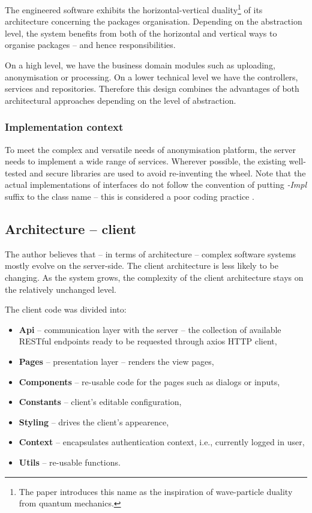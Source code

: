 \documentclass[a4paper,twoside,12pt]{book}
\begin{document}
The engineered software exhibits the horizontal-vertical duality\footnote{The paper introduces this name as the inspiration of wave-particle duality from quantum mechanics.} of its architecture concerning the packages organisation. Depending on the abstraction level, the system benefits from both of the horizontal and vertical ways to organise packages -- and hence responsibilities.

On a high level, we have the business domain modules such as uploading, anonymisation or processing. On a lower technical level we have the controllers, services and repositories. Therefore this design combines the advantages of both architectural approaches depending on the level of abstraction.


\subsubsection{Implementation context}

To meet the complex and versatile needs of anonymisation platform, the server needs to implement a wide range of services. Wherever possible, the existing well-tested and secure libraries are used to avoid re-inventing the wheel. Note that the actual implementations of interfaces do not follow the convention of putting \textit{-Impl} suffix to the class name -- this is considered a poor coding practice \cite{bib:clean_architecture}.

\subsection{Architecture -- client}
 
The author believes that -- in terms of architecture -- complex software systems mostly evolve on the server-side. The client architecture is less likely to be changing. As the system grows, the complexity of the client architecture stays on the relatively unchanged level.

The client code was divided into:
\begin{itemize}
\item \textbf{Api} -- communication layer with the server -- the collection of available RESTful endpoints ready to be requested through axios HTTP client,
\item \textbf{Pages} -- presentation layer -- renders the view pages,
\item \textbf{Components} -- re-usable code for the pages such as dialogs or inputs, 
\item \textbf{Constants} -- client's editable configuration,
\item \textbf{Styling} -- drives the client's appearence,
\item \textbf{Context} -- encapsulates authentication context, i.e., currently logged in user,
\item \textbf{Utils} -- re-usable functions.
\end{itemize}
\end{document}
